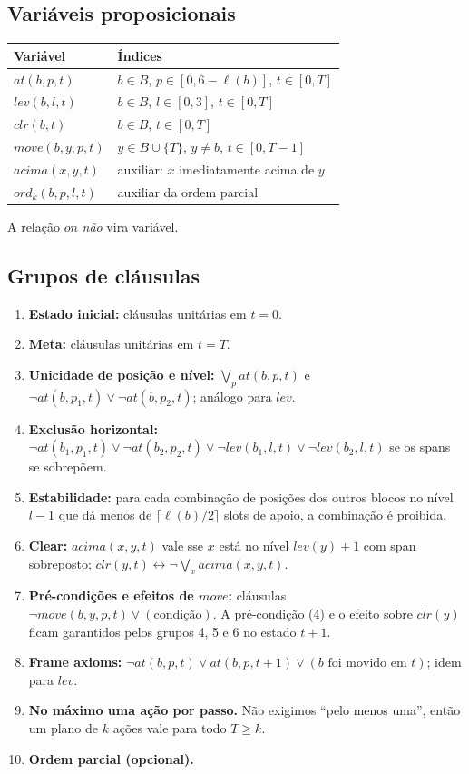 \documentclass[11pt,a4paper]{article}
\newcommand{\at}{\mathit{at}}
\newcommand{\lev}{\mathit{lev}}
\newcommand{\clr}{\mathit{clr}}
\newcommand{\on}{\mathit{on}}
\newcommand{\mv}{\mathit{move}}
\begin{document}
\subsection{Vari\'aveis proposicionais}
\begin{center}
\begin{tabular}{ll}
\toprule
Vari\'avel & \'Indices\\
\midrule
$\at(b,p,t)$ & $b\in B$, $p\in[0,6-\ell(b)]$, $t\in[0,T]$\\
$\lev(b,l,t)$ & $b\in B$, $l\in[0,3]$, $t\in[0,T]$\\
$\clr(b,t)$ & $b\in B$, $t\in[0,T]$\\
$\mv(b,y,p,t)$ & $y\in B\cup\{T\}$, $y\neq b$, $t\in[0,T-1]$\\
$\mathit{acima}(x,y,t)$ & auxiliar: $x$ imediatamente acima de $y$\\
$\mathit{ord}_k(b,p,l,t)$ & auxiliar da ordem parcial\\
\bottomrule
\end{tabular}
\end{center}
A rela\c{c}\~ao $\on$ \emph{n\~ao} vira vari\'avel.

\subsection{Grupos de cl\'ausulas}
\begin{enumerate}
\item \textbf{Estado inicial:} cl\'ausulas unit\'arias em $t=0$.
\item \textbf{Meta:} cl\'ausulas unit\'arias em $t=T$.
\item \textbf{Unicidade de posi\c{c}\~ao e n\'ivel:} $\bigvee_p \at(b,p,t)$ e $\neg\at(b,p_1,t)\vee\neg\at(b,p_2,t)$; an\'alogo para $\lev$.
\item \textbf{Exclus\~ao horizontal:} $\neg\at(b_1,p_1,t)\vee\neg\at(b_2,p_2,t)\vee\neg\lev(b_1,l,t)\vee\neg\lev(b_2,l,t)$ se os spans se sobrep\~oem.
\item \textbf{Estabilidade:} para cada combina\c{c}\~ao de posi\c{c}\~oes dos outros blocos no n\'ivel $l-1$ que d\'a menos de $\lceil\ell(b)/2\rceil$ slots de apoio, a combina\c{c}\~ao \'e proibida.
\item \textbf{Clear:} $\mathit{acima}(x,y,t)$ vale sse $x$ est\'a no n\'ivel $\lev(y)+1$ com span sobreposto; $\clr(y,t)\leftrightarrow\neg\bigvee_x\mathit{acima}(x,y,t)$.
\item \textbf{Pr\'e-condi\c{c}\~oes e efeitos de $\mv$:} cl\'ausulas $\neg\mv(b,y,p,t)\vee(\text{condi\c{c}\~ao})$. A pr\'e-condi\c{c}\~ao (4) e o efeito sobre $\clr(y)$ ficam garantidos pelos grupos 4, 5 e 6 no estado $t+1$.
\item \textbf{Frame axioms:} $\neg\at(b,p,t)\vee\at(b,p,t+1)\vee(\text{$b$ foi movido em }t)$; idem para $\lev$.
\item \textbf{No m\'aximo uma a\c{c}\~ao por passo.} N\~ao exigimos ``pelo menos uma'', ent\~ao um plano de $k$ a\c{c}\~oes vale para todo $T\ge k$.
\item \textbf{Ordem parcial (opcional).}
\end{enumerate}
\end{document}
